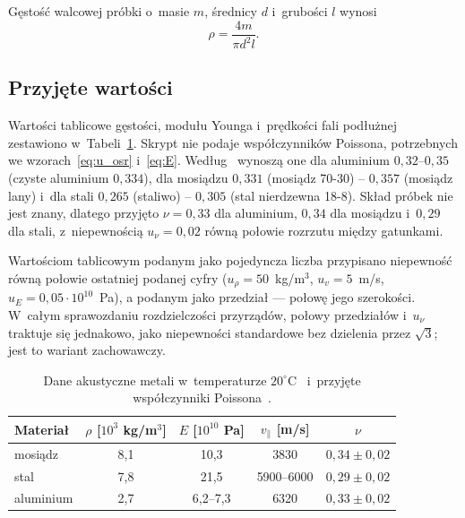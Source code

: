 \documentclass[12pt, a4paper]{article}
\begin{document}
Gęstość walcowej próbki o~masie $m$, średnicy $d$ i~grubości $l$ wynosi
\begin{equation}
    \rho = \frac{4m}{\pi d^2 l}.
    \label{eq:rho}
\end{equation}

\subsection{Przyjęte wartości}

Wartości tablicowe gęstości, modułu Younga i~prędkości fali podłużnej zestawiono
w~Tabeli~\ref{tab:tablica}. Skrypt nie podaje współczynników Poissona, potrzebnych we
wzorach~\eqref{eq:u_osr} i~\eqref{eq:E}. Według~\cite{poisson} wynoszą one dla aluminium
$0{,}32$--$0{,}35$ (czyste aluminium $0{,}334$), dla mosiądzu $0{,}331$ (mosiądz 70-30) --
$0{,}357$ (mosiądz lany) i~dla stali $0{,}265$ (staliwo) -- $0{,}305$ (stal nierdzewna 18-8).
Skład próbek nie jest znany, dlatego przyjęto $\nu = 0{,}33$ dla aluminium, $0{,}34$ dla
mosiądzu i~$0{,}29$ dla stali, z~niepewnością $u_\nu = 0{,}02$ równą połowie rozrzutu między
gatunkami.

Wartościom tablicowym podanym jako pojedyncza liczba przypisano niepewność równą połowie
ostatniej podanej cyfry ($u_\rho = 50$~kg/m$^3$, $u_v = 5$~m/s, $u_E = 0{,}05 \cdot 10^{10}$~Pa),
a podanym jako przedział --- połowę jego szerokości. W~całym sprawozdaniu rozdzielczości
przyrządów, połowy przedziałów i~$u_\nu$ traktuje się jednakowo, jako niepewności standardowe
bez dzielenia przez $\sqrt{3}$; jest to wariant zachowawczy.

\begin{table}[H]
    \centering
    \caption{Dane akustyczne metali w~temperaturze $20^{\circ}$C~\cite{skrypt} i~przyjęte
             współczynniki Poissona~\cite{poisson}.}
    \label{tab:tablica}
    \begin{tabular}{lcccc}
        \toprule
        Materiał & {$\rho$ [$10^3$ kg/m$^3$]} & {$E$ [$10^{10}$ Pa]} & {$v_\parallel$ [m/s]} & {$\nu$} \\
        \midrule
        mosiądz   & 8,1 & 10,3      & 3830        & $0{,}34 \pm 0{,}02$ \\
        stal      & 7,8 & 21,5      & 5900--6000  & $0{,}29 \pm 0{,}02$ \\
        aluminium & 2,7 & 6,2--7,3  & 6320        & $0{,}33 \pm 0{,}02$ \\
        \bottomrule
    \end{tabular}
\end{table}
\end{document}
